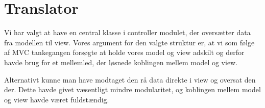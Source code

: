 \section{Translator}

Vi har valgt at have en central klasse i controller modulet, der oversætter data fra modellen til view. Vores argument for den valgte struktur er, at vi som følge af MVC tankegangen forsøgte at holde vores model og view adskilt og derfor havde brug for et mellemled, der løsnede koblingen mellem model og view.

Alternativt kunne man have modtaget den rå data direkte i view og oversat den der. Dette havde givet væsentligt mindre modularitet, og koblingen mellem model og view havde været fuldstændig.